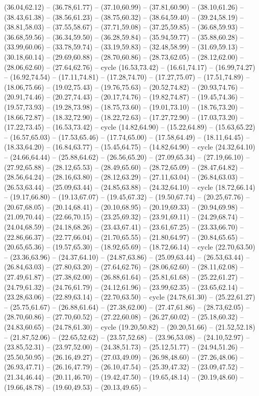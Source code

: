 {(36.04,62.12) -- (36.78,61.77) -- (37.10,60.99) -- (37.81,60.90) -- (38.10,61.26) -- (38.43,61.38) -- (38.56,61.23) -- (38.75,60.32) -- (38.64,59.40) -- (39.24,58.19) -- (38.81,58.03) -- (37.55,58.67) -- (37.71,59.08) -- (37.25,59.85) -- (36.68,59.93) -- (36.68,59.56) -- (36.34,59.50) -- (36.28,59.84) -- (35.94,59.77) -- (35.88,60.28) -- (33.99,60.06) -- (33.78,59.74) -- (33.19,59.83) -- (32.48,58.99) -- (31.69,59.13) -- (30.18,60.14) -- (29.69,60.88) -- (28.70,60.86) -- (28.73,62.05) -- (28.12,62.00) -- (28.06,62.60) -- (27.64,62.76) -- cycle (16.53,73.42) -- (16.61,74.17) -- (16.99,74.27) -- (16.92,74.54) -- (17.11,74.81) -- (17.28,74.70) -- (17.27,75.07) -- (17.51,74.89) -- (18.06,75.66) -- (19.02,75.43) -- (19.76,75.63) -- (20.52,74.82) -- (20.93,74.76) -- (20.91,74.46) -- (20.27,74.43) -- (20.17,74.76) -- (19.82,74.87) -- (19.45,74.36) -- (19.57,73.93) -- (19.28,73.98) -- (18.75,73.60) -- (19.01,73.10) -- (18.76,73.20) -- (18.66,72.87) -- (18.32,72.90) -- (18.22,72.63) -- (17.27,72.90) -- (17.03,73.20) -- (17.22,73.45) -- (16.53,73.42) -- cycle (14.82,64.90) -- (15.22,64.89) -- (15.63,65.22) -- (16.57,65.03) -- (17.53,65.46) -- (17.74,65.00) -- (17.58,64.49) -- (18.11,64.45) -- (18.33,64.20) -- (16.84,63.77) -- (15.45,64.75) -- (14.82,64.90) -- cycle (24.32,64.10) -- (24.66,64.44) -- (25.88,64.62) -- (26.56,65.20) -- (27.09,65.34) -- (27.19,66.10) -- (27.92,65.88) -- (28.12,65.53) -- (28.49,65.60) -- (28.72,65.09) -- (28.47,64.82) -- (28.56,64.24) -- (28.16,63.80) -- (28.12,63.29) -- (27.11,63.04) -- (26.84,63.03) -- (26.53,63.44) -- (25.09,63.44) -- (24.85,63.88) -- (24.32,64.10) -- cycle (18.72,66.14) -- (19.17,66.80) -- (19.13,67.07) -- (19.45,67.32) -- (19.50,67.74) -- (20.25,67.76) -- (20.67,68.05) -- (20.14,68.41) -- (20.10,68.95) -- (20.19,69.33) -- (20.94,69.98) -- (21.09,70.44) -- (22.66,70.15) -- (23.25,69.32) -- (23.91,69.11) -- (24.29,68.74) -- (24.04,68.59) -- (24.18,68.26) -- (23.43,67.41) -- (23.61,67.25) -- (23.33,66.70) -- (22.86,66.37) -- (22.77,66.04) -- (21.70,65.55) -- (21.80,64.97) -- (20.84,65.65) -- (20.65,65.36) -- (19.57,65.30) -- (18.92,65.69) -- (18.72,66.14) -- cycle (22.70,63.50) -- (23.36,63.96) -- (24.37,64.10) -- (24.87,63.86) -- (25.09,63.44) -- (26.53,63.44) -- (26.84,63.03) -- (27.80,63.20) -- (27.64,62.76) -- (28.06,62.60) -- (28.11,62.08) -- (27.49,61.87) -- (27.38,62.00) -- (26.88,61.64) -- (25.81,61.68) -- (25.22,61.27) -- (24.79,61.32) -- (24.76,61.79) -- (24.12,61.96) -- (23.99,62.35) -- (23.65,62.14) -- (23.28,63.06) -- (22.89,63.14) -- (22.70,63.50) -- cycle (24.78,61.30) -- (25.22,61.27) -- (25.75,61.67) -- (26.88,61.64) -- (27.38,62.00) -- (27.47,61.86) -- (28.73,62.05) -- (28.70,60.86) -- (27.70,60.52) -- (27.22,60.08) -- (26.27,60.02) -- (25.18,60.32) -- (24.83,60.65) -- (24.78,61.30) -- cycle (19.20,50.82) -- (20.20,51.66) -- (21.52,52.18) -- (21.87,52.06) -- (22.65,52.62) -- (23.57,52.68) -- (23.96,53.08) -- (24.10,52.97) -- (23.85,52.31) -- (23.97,52.00) -- (24.38,51.73) -- (25.12,51.77) -- (24.94,51.26) -- (25.50,50.95) -- (26.16,49.27) -- (27.03,49.09) -- (26.98,48.60) -- (27.26,48.06) -- (26.93,47.71) -- (26.16,47.79) -- (26.10,47.54) -- (25.39,47.32) -- (23.09,47.52) -- (21.34,46.44) -- (20.11,46.70) -- (19.42,47.50) -- (19.65,48.14) -- (20.19,48.60) -- (19.66,48.78) -- (19.60,49.53) -- (20.13,49.65) -- }

